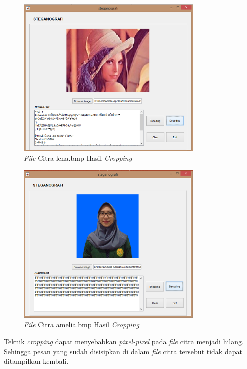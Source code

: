 	\begin{figure}[H]
		\centering
		\includegraphics[width=0.8\textwidth]{gambar/matlab/lena_crop}
		\caption{\emph{File} Citra lena.bmp Hasil \emph{Cropping}}
		\label{lena_crop}
	\end{figure}

	\begin{figure}[H]
		\centering
		\includegraphics[width=0.8\textwidth]{gambar/matlab/amelia_crop}
		\caption{\emph{File} Citra amelia.bmp Hasil \emph{Cropping}}
		\label{amelia_crop}
	\end{figure}

	Teknik \emph{cropping} dapat menyebabkan \emph{pixel-pixel} pada \emph{file} citra menjadi hilang. Sehingga pesan yang sudah disisipkan di dalam \emph{file} citra tersebut tidak dapat ditampilkan kembali.
		 
